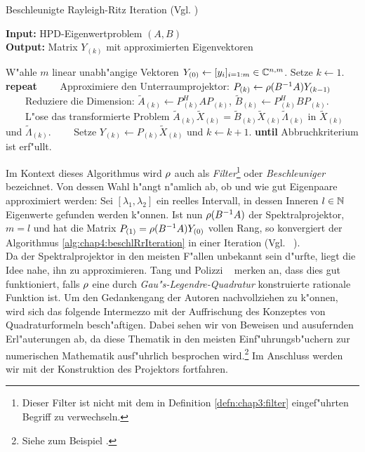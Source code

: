 \newpage

\begin{algorithm}
\caption{Beschleunigte Rayleigh-Ritz Iteration (Vgl. \cite[Algorithmus A]{ptep})}\label{alg:chap4:beschlRrIteration}
\vspace{.15cm}
\textbf{Input:} HPD-Eigenwertproblem $(A,B)$\\
\textbf{Output:} Matrix $Y_{(k)}$ mit approximierten Eigenvektoren
\begin{algorithmic}[1]
\State W"ahle $m$ linear unabh"angige Vektoren $Y_{(0)} \gets [y_i]_{i=1:m} \in\mathbb{C}^{n,m}$.
Setze $k \gets 1$.
\State \textbf{repeat}
\State \ \ \ \ Approximiere den Unterraumprojektor: $P_{(k)} \gets \rho(B^{-1}A)Y_{(k-1)}$
\State \ \ \ \ Reduziere die Dimension: $\widetilde{A}_{(k)} \gets P_{(k)}^H A P_{(k)}$,
$\widetilde{B}_{(k)} \gets P_{(k)}^H B P_{(k)}$.
\State \ \ \ \ L"ose das transformierte Problem $\widetilde{A}_{(k)}\widetilde{X}_{(k)}
= \widetilde{B}_{(k)}\widetilde{X}_{(k)}\widetilde{\Lambda}_{(k)}$ in
$\widetilde{X}_{(k)}$ und $\widetilde{\Lambda}_{(k)}$.
\State \ \ \ \ Setze $Y_{(k)} \gets P_{(k)}\widetilde{X}_{(k)}$ und $k \gets k+1$.
\State \textbf{until} Abbruchkriterium ist erf"ullt.
\end{algorithmic}
\end{algorithm}

Im Kontext dieses Algorithmus wird $\rho$ auch als \emph{Filter}\footnote{Dieser Filter ist nicht mit dem in Definition \ref{defn:chap3:filter} eingef"uhrten Begriff zu verwechseln.} oder \emph{Beschleuniger}
bezeichnet. Von dessen Wahl h"angt n"amlich ab, ob und wie gut Eigenpaare approximiert
werden: Sei $[\lambda_1,\lambda_2]$ ein reelles Intervall, in dessen Inneren $l\in\mathbb{N}$ Eigenwerte gefunden werden k"onnen. Ist nun $\rho(B^{-1}A)$ der Spektralprojektor,
$m=l$ und hat die Matrix $P_{(1)} = \rho(B^{-1}A) Y_{(0)}$ vollen Rang, so konvergiert der Algorithmus \ref{alg:chap4:beschlRrIteration} in einer Iteration
(Vgl. ~\cite[356]{ptep}).\\

Da der Spektralprojektor in den meisten F"allen unbekannt sein d"urfte, liegt
die Idee nahe, ihn zu approximieren. Tang und Polizzi ~\cite[356]{ptep} merken an, dass dies gut funktioniert, falls $\rho$ eine durch \emph{Gau"s-Legendre-Quadratur} konstruierte rationale Funktion ist.
Um den Gedankengang der Autoren nachvollziehen zu k"onnen, wird sich das folgende Intermezzo mit der Auffrischung des Konzeptes von Quadraturformeln besch"aftigen. Dabei sehen wir von Beweisen und ausufernden Erl"auterungen ab, da diese Thematik in den meisten Einf"uhrungsb"uchern zur numerischen Mathematik ausf"uhrlich besprochen wird.\footnote{Siehe zum Beispiel \cite[Abschnitt 6]{plato}.} Im Anschluss werden wir mit der
Konstruktion des Projektors fortfahren.

